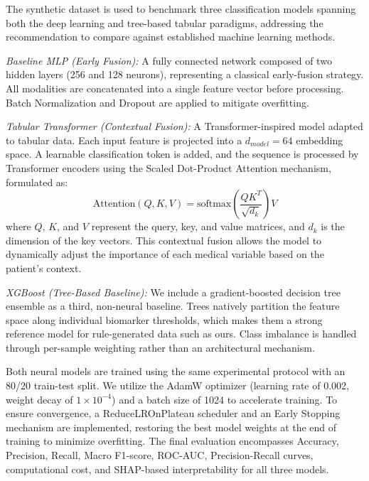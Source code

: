 The synthetic dataset is used to benchmark three classification models spanning both the deep learning and tree-based tabular paradigms, addressing the recommendation to compare against established machine learning methods.

\textit{Baseline MLP (Early Fusion):} A fully connected network composed of two hidden layers (256 and 128 neurons), representing a classical early-fusion strategy. All modalities are concatenated into a single feature vector before processing. Batch Normalization and Dropout \cite{srivastava2014} are applied to mitigate overfitting. 

\textit{Tabular Transformer (Contextual Fusion):} A Transformer-inspired model adapted to tabular data. Each input feature is projected into a $d_{model}=64$ embedding space. A learnable classification token is added, and the sequence is processed by Transformer encoders using the Scaled Dot-Product Attention mechanism, formulated as:
\begin{equation}
\text{Attention}(Q, K, V) = \text{softmax}\left(\frac{QK^T}{\sqrt{d_k}}\right)V
\end{equation}
where $Q$, $K$, and $V$ represent the query, key, and value matrices, and $d_k$ is the dimension of the key vectors. This contextual fusion allows the model to dynamically adjust the importance of each medical variable based on the patient's context.

\textit{XGBoost (Tree-Based Baseline):} We include a gradient-boosted decision tree ensemble as a third, non-neural baseline. Trees natively partition the feature space along individual biomarker thresholds, which makes them a strong reference model for rule-generated data such as ours. Class imbalance is handled through per-sample weighting rather than an architectural mechanism.

Both neural models are trained using the same experimental protocol with an 80/20 train-test split. We utilize the AdamW optimizer \cite{loshchilov2019} (learning rate of 0.002, weight decay of $1\times 10^{-4}$) and a batch size of 1024 to accelerate training. To ensure convergence, a ReduceLROnPlateau scheduler and an Early Stopping mechanism are implemented, restoring the best model weights at the end of training to minimize overfitting. The final evaluation encompasses Accuracy, Precision, Recall, Macro F1-score, ROC-AUC, Precision-Recall curves, computational cost, and SHAP-based interpretability for all three models.